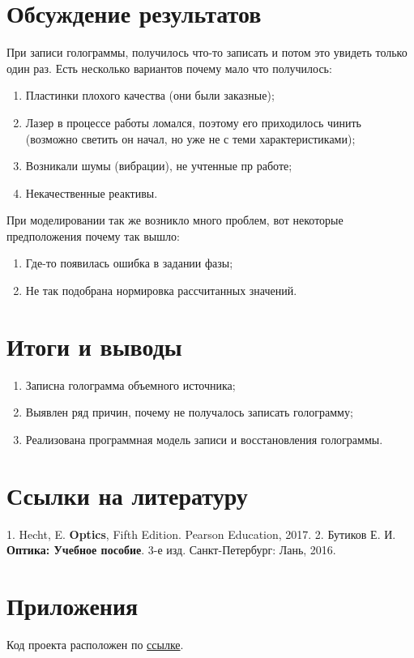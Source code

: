 \documentclass[aps,twocolumn,secnumarabic,balancelastpage,amsmath,amssymb,nofootinbib, floatfix]{revtex4-1}
\begin{document}
\section{Обсуждение результатов}
\par При записи голограммы, получилось что-то записать и потом это увидеть только один раз. Есть несколько вариантов почему мало что получилось:
\begin{enumerate}
	\item Пластинки плохого качества (они были заказные);
	\item Лазер в процессе работы ломался, поэтому его приходилось чинить (возможно светить он начал, но уже не с теми характеристиками);
	\item Возникали шумы (вибрации), не учтенные пр работе;
	\item Некачественные реактивы.
\end{enumerate}
\par При моделировании так же возникло много проблем, вот некоторые предположения почему так вышло:
\begin{enumerate}
	\item Где-то появилась ошибка в задании фазы;
	\item Не так подобрана нормировка рассчитанных значений.
\end{enumerate}
\section{ Итоги и выводы  }
\begin{enumerate}
	\item Записна голограмма объемного источника;
	\item Выявлен ряд причин, почему не получалось записать голограмму;
	\item Реализована программная модель записи и восстановления голограммы.
\end{enumerate}
\section{Ссылки на литературу}  

1. Hecht, E. \textbf{Optics}, Fifth Edition. Pearson Education, 2017.  
2. Бутиков Е. И. \textbf{Оптика: Учебное пособие}. 3-е изд. Санкт-Петербург: Лань, 2016.  

\section{Приложения}  
Код проекта расположен по \href{https://github.com/ArinaLuzgina/holographySimulation}{ссылке}.
\end{document}
